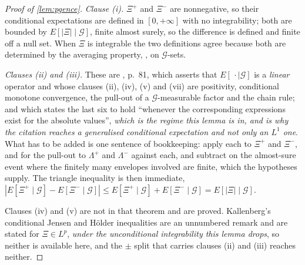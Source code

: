 \begin{proof}[Proof of \cref{lem:pgence}]
\emph{Clause (i).} $\Xi^{+}$ and $\Xi^{-}$ are nonnegative, so their conditional expectations are defined
in $[0,+\infty]$ with no integrability; both are bounded by $E[|\Xi|\mid\mathcal G]$, finite almost surely,
so the difference is defined and finite off a null set. When $\Xi$ is integrable the two definitions agree
because both are determined by the averaging property, \citet[Thm.~5.1(i)]{kallenberg1997}, on
$\mathcal G$-sets.

\emph{Clauses (ii) and (iii).} These are \citet[Thm.~5.1]{kallenberg1997}, p.~81, which asserts that
$E[\,\cdot\mid\mathcal G]$ is a \emph{linear} operator and whose clauses \textup{(ii)}, \textup{(iv)},
\textup{(v)} and \textup{(vii)} are positivity, conditional monotone convergence, the pull-out of a
$\mathcal G$-measurable factor and the chain rule; and which states the last six to
hold ``whenever the corresponding expressions exist for the absolute values'', \emph{which is the
regime this lemma is in, and is why the citation reaches a generalised conditional expectation and not
only an $L^{1}$ one}. What has to be added is one sentence of bookkeeping: apply each to $\Xi^{+}$ and
$\Xi^{-}$, and for the pull-out to $\Lambda^{+}$ and $\Lambda^{-}$ against each, and subtract on the
almost-sure event where the finitely many envelopes involved are finite, which the hypotheses supply. The
triangle inequality is then immediate,
$|E[\Xi^{+}\mid\mathcal G]-E[\Xi^{-}\mid\mathcal G]|
\le E[\Xi^{+}\mid\mathcal G]+E[\Xi^{-}\mid\mathcal G]=E[|\Xi|\mid\mathcal G]$.

Clauses \textup{(iv)} and \textup{(v)} are not in that theorem and are proved. Kallenberg's
conditional Jensen and Hölder inequalities are an unnumbered remark \citep[p.~86]{kallenberg1997} and are
stated for $\Xi\in L^{p}$, \emph{under the unconditional integrability this lemma drops}, so
neither is available here, and the $\pm$ split that carries clauses (ii) and (iii) reaches neither.


\end{proof}
